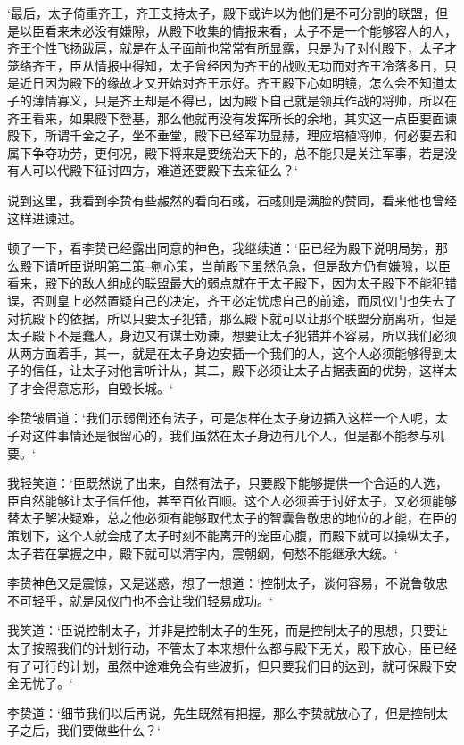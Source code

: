 ‘最后，太子倚重齐王，齐王支持太子，殿下或许以为他们是不可分割的联盟，但是以臣看来未必没有嫌隙，从殿下收集的情报来看，太子不是一个能够容人的人，齐王个性飞扬跋扈，就是在太子面前也常常有所显露，只是为了对付殿下，太子才笼络齐王，臣从情报中得知，太子曾经因为齐王的战败无功而对齐王冷落多日，只是近日因为殿下的缘故才又开始对齐王示好。齐王殿下心如明镜，怎么会不知道太子的薄情寡义，只是齐王却是不得已，因为殿下自己就是领兵作战的将帅，所以在齐王看来，如果殿下登基，那么他就再没有发挥所长的余地，其实这一点臣要面谏殿下，所谓千金之子，坐不垂堂，殿下已经军功显赫，理应培植将帅，何必要去和属下争夺功劳，更何况，殿下将来是要统治天下的，总不能只是关注军事，若是没有人可以代殿下征讨四方，难道还要殿下去亲征么？‘

说到这里，我看到李贽有些赧然的看向石彧，石彧则是满脸的赞同，看来他也曾经这样进谏过。

顿了一下，看李贽已经露出同意的神色，我继续道：‘臣已经为殿下说明局势，那么殿下请听臣说明第二策--剜心策，当前殿下虽然危急，但是敌方仍有嫌隙，以臣看来，殿下的敌人组成的联盟最大的弱点就在于太子殿下，因为太子殿下不能犯错误，否则皇上必然置疑自己的决定，齐王必定忧虑自己的前途，而凤仪门也失去了对抗殿下的依据，所以只要太子犯错，那么殿下就可以让那个联盟分崩离析，但是太子殿下不是蠢人，身边又有谋士劝谏，想要让太子犯错并不容易，所以我们必须从两方面着手，其一，就是在太子身边安插一个我们的人，这个人必须能够得到太子的信任，让太子对他言听计从，其二，殿下必须让太子占据表面的优势，这样太子才会得意忘形，自毁长城。‘

李贽皱眉道：‘我们示弱倒还有法子，可是怎样在太子身边插入这样一个人呢，太子对这件事情还是很留心的，我们虽然在太子身边有几个人，但是都不能参与机要。‘

我轻笑道：‘臣既然说了出来，自然有法子，只要殿下能够提供一个合适的人选，臣自然能够让太子信任他，甚至百依百顺。这个人必须善于讨好太子，又必须能够替太子解决疑难，总之他必须有能够取代太子的智囊鲁敬忠的地位的才能，在臣的策划下，这个人就会成了太子时刻不能离开的宠臣心腹，而殿下就可以操纵太子，太子若在掌握之中，殿下就可以清宇内，震朝纲，何愁不能继承大统。‘

李贽神色又是震惊，又是迷惑，想了一想道：‘控制太子，谈何容易，不说鲁敬忠不可轻乎，就是凤仪门也不会让我们轻易成功。‘

我笑道：‘臣说控制太子，并非是控制太子的生死，而是控制太子的思想，只要让太子按照我们的计划行动，不管太子本来想什么都与殿下无关，殿下放心，臣已经有了可行的计划，虽然中途难免会有些波折，但只要我们目的达到，就可保殿下安全无忧了。‘

李贽道：‘细节我们以后再说，先生既然有把握，那么李贽就放心了，但是控制太子之后，我们要做些什么？‘

